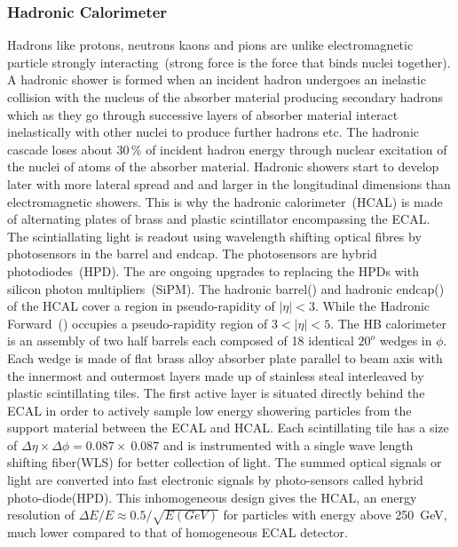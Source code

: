  



\subsubsection{Hadronic Calorimeter}
Hadrons like protons, neutrons kaons and pions are unlike electromagnetic particle strongly interacting~(strong force is the force that binds nuclei together). A hadronic shower is formed when an incident hadron undergoes an inelastic collision with the nucleus of the absorber material producing secondary hadrons which as they go through successive layers of absorber material interact inelastically with other nuclei to produce further hadrons etc. 
The  hadronic cascade loses about 30\,\% of incident hadron energy through nuclear excitation of the nuclei of atoms of the  absorber material.  Hadronic showers start to develop later with more lateral spread and and larger in the longitudinal dimensions than electromagnetic showers. This is why the hadronic calorimeter~(HCAL) is made of alternating plates of brass and plastic scintillator encompassing the ECAL. The scintiallating light is readout using wavelength shifting optical fibres by photosensors in the barrel and endcap. The photosensors are hybrid photodiodes~(HPD). The are ongoing upgrades to replacing the HPDs with silicon photon multipliers~(SiPM). 
The  hadronic barrel() and hadronic endcap() of the HCAL cover a region in pseudo-rapidity of $\vert \eta \vert < 3$. While the Hadronic Forward~() occupies a pseudo-rapidity region of $3 < \vert \eta \vert < 5$.
The HB calorimeter is an assembly of two half barrels each composed of 18 identical $20^{o}$ wedges in $\phi$. Each wedge is made of flat brass alloy absorber plate parallel to beam axis with the innermost and outermost layers made up of stainless steal interleaved by plastic scintillating tiles.
The first active layer is situated directly behind the ECAL in order to actively sample low energy showering particles from the support material between the ECAL and HCAL. Each scintillating tile has a size of $\Delta\eta\times\Delta\phi=0.087 \times\ 0.087$ and is instrumented with a single wave length shifting fiber(WLS) for better collection of light. The summed optical signals or light are converted into fast electronic
signals by photo-sensors called  hybrid photo-diode(HPD).
This inhomogeneous design gives the HCAL, an energy resolution of ${\displaystyle \Delta E/E \approx 0.5/\sqrt{E(GeV)} }$ for particles with energy above 250~GeV, much lower compared to that of homogeneous ECAL detector.

